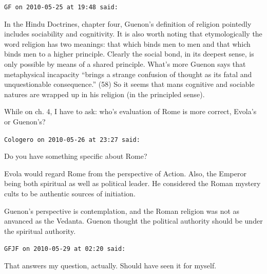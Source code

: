 \begin{footnotesize}
\begin{sffamily}
\texttt{GF on 2010-05-25 at 19:48 said:}

In the Hindu Doctrines, chapter four, Guenon's definition of religion pointedly includes sociability and cognitivity. It is also worth noting that etymologically the word religion has two meanings: that which binds men to men and that which binds men to a higher principle. Clearly the social bond, in its deepest sense, is only possible by means of a shared principle. What's more Guenon says that metaphysical incapacity ``brings a strange confusion of thought as its fatal and unquestionable consequence.'' (58) So it seems that mans cognitive and sociable natures are wrapped up in his religion (in the principled sense).

While on ch. 4, I have to ask: who's evaluation of Rome is more correct, Evola's or Guenon's?

\hfill

\texttt{Cologero on 2010-05-26 at 23:27 said:}

Do you have something specific about Rome?

Evola would regard Rome from the perspective of Action. Also, the Emperor being both spiritual as well as political leader. He considered the Roman mystery cults to be authentic sources of initiation.

Guenon's perspective is contemplation, and the Roman religion was not as anvanced as the Vedanta. Guenon thought the political authority should be under the spiritual authority.

\hfill

\texttt{GFJF on 2010-05-29 at 02:20 said:}

That answers my question, actually. Should have seen it for myself.

\hfill

\end{sffamily}
\end{footnotesize}

